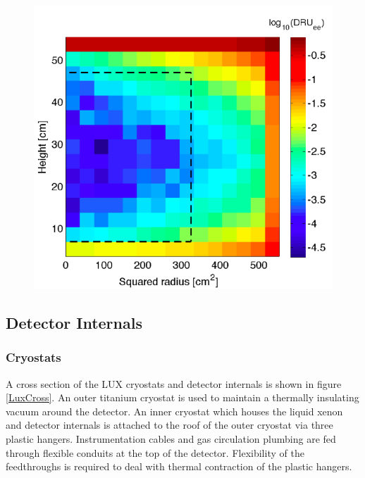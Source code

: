 \documentclass[a4paper,12pt]{article}
\begin{document}
 \begin{figure} 
\includegraphics[scale=.5]{GammaBackgrounds.png} 
\label{GammaBackgrounds}
\end{figure}

\newpage

\subsection{Detector Internals}
\subsubsection{Cryostats} %


A cross section of the LUX cryostats and detector internals is shown in figure \ref{LuxCross}.  An outer titanium cryostat is used to maintain a thermally insulating vacuum around the detector.  An inner cryostat which houses the liquid xenon and detector internals is attached to the roof of the outer cryostat via three plastic hangers.  Instrumentation cables and gas circulation plumbing are fed through flexible conduits at the top of the detector.  Flexibility of the feedthroughs is required to deal with thermal contraction of the plastic hangers.
\end{document}
